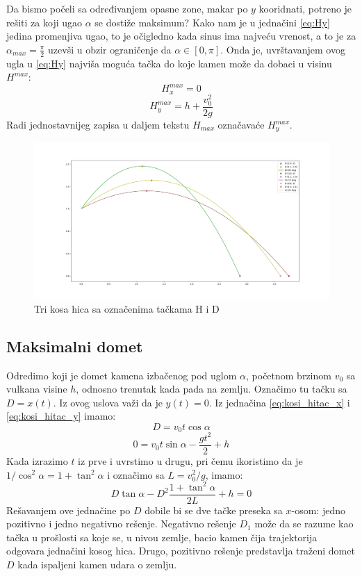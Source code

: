 \documentclass[a4paper]{article}
\begin{document}
Da bismo počeli sa određivanjem opasne zone, makar po $y$ kooridnati, 
potreno je rešiti za koji ugao $\alpha$ se dostiže maksimum? 
Kako nam je u jednačini \ref{eq:Hy} jedina promenjiva ugao, 
to je očigledno kada sinus ima najveću vrenost,
a to je za $\alpha_{max} = \frac{\pi}{2}$ uzevši u obzir ograničenje 
da $\alpha \in [0, \pi]$. Onda je, uvrštavanjem ovog ugla u \ref{eq:Hy}
 najviša moguća tačka do koje kamen može da dobaci u visinu $H^{max}$:
\begin{equation}
\label{eq:Hmax_x}
H^{max}_{x} = 0
\end{equation}
\begin{equation}
\label{eq:Hmax_y}
H^{max}_{y} = h + \frac{v_0^2 }{2g}
\end{equation}
Radi jednostavnijeg zapisa u daljem tekstu $H_{max}$ označavaće $H^{max}_y$.

\begin{figure}[h!]
\begin{center}
\includegraphics[width=\textwidth]{2D_hitac_vise.png}
\end{center}
\caption{Tri kosa hica sa označenima tačkama H i D}
\label{fig:kosi_hitac_tacke}
\end{figure}

\subsection{Maksimalni domet}
\label{sec:max_domet}
Odredimo koji je domet kamena izbačenog pod uglom $\alpha$, početnom brzinom $v_0$ sa 
vulkana visine $h$, odnosno trenutak kada pada na zemlju. Označimo tu tačku sa $D = x(t)$.
Iz ovog uslova važi da je $y(t) = 0$. Iz jednačina \ref{eq:kosi_hitac_x}  i 
\ref{eq:kosi_hitac_y} imamo:
$$ D = v_0t \cos \alpha $$
$$ 0 = v_0 t \sin \alpha - \frac{gt^2}{2} + h $$
Kada izrazimo $t$ iz prve i uvrstimo u drugu, pri čemu ikoristimo da je 
$1/\cos^2\alpha = 1+\tan^2\alpha$ i označimo sa $L = v_0^2/g$, imamo:
\begin{equation}
\label{eq:pocetak_sa_L}
D \tan \alpha - D^2\frac{1+\tan^2 \alpha}{2L} + h = 0
\end{equation}
Rešavanjem ove jednačine po $D$ dobile bi se dve tačke preseka sa $x$-osom: jedno pozitivno
i jedno negativno rešenje.
Negativno rešenje $D_1$ može da se razume kao tačka u prošlosti sa koje se, 
u nivou zemlje, bacio kamen čija trajektorija odgovara jednačini kosog hica. Drugo,
pozitivno rešenje predstavlja traženi domet $D$ kada ispaljeni kamen udara o zemlju.\\
\end{document}
